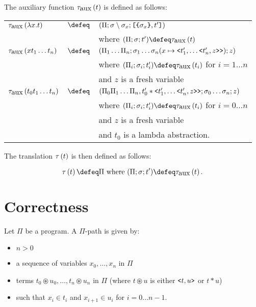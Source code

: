 \documentclass{article}
\begin{document}
The auxiliary function $\tau_{\mbox{aux}}\left(t\right)$ is defined as follows:

\begin{center}
\bgroup
\def\arraystretch{1.3}
\begin{tabular}{lcl}
    $\tau_{\mbox{aux}}\left(\lambda x. t\right) $ & $\defeq$ & $(\Pi; \sigma \setminus \sigma_x; \mbox{\texttt{[}}\mbox{\texttt{\{}}\sigma_x\mbox{\texttt{\}}}, t'\mbox{\texttt{]}}) $ \\
    & & where $(\cuts; \sigma; t') \defeq \ltransaux{t}$ \\
    $\tau_{\mbox{aux}}\left(x t_1 \ldots t_n\right)$ & $\defeq$ & $(\Pi_1\ldots\Pi_n; \sigma_1\ldots \sigma_n(x\mapsto\mbox{\texttt{<}} t_1', \ldots\mbox{\texttt{<}} t_n', z\mbox{\texttt{>}}\mbox{\texttt{>}}); z) $ \\
    & & where $(\cuts_i; \sigma_i; t_i') \defeq \ltransaux{t_i}$ for $i=1\ldots n$\\
    & & and $z$ is a fresh variable \\
    $\tau_{\mbox{aux}}\left(t_0 t_1 \ldots t_n\right)$ & $\defeq$ & $(\Pi_0\Pi_1\ldots\Pi_n, t_0' * \mbox{\texttt{<}} t_1', \ldots\mbox{\texttt{<}} t_n', z\mbox{\texttt{>}}\mbox{\texttt{>}}; \sigma_0\ldots \sigma_n; z)$ \\
    & & where $(\cuts_i; \sigma_i; t_i') \defeq \ltransaux{t_i}$ for $i=0\ldots n$ \\
    & & and $z$ is a fresh variable \\
    & & and $t_0$ is a lambda abstraction. \\
\end{tabular}
\egroup
\end{center}

The translation $\tau\left(t\right)$ is then defined as follows:

\[\ltrans{t} \defeq \cuts \mbox{ where } (\cuts; \sigma; t') \defeq \ltransaux{t}. \]

\section{Correctness}

\begin{definition}[$\Pi$-path]
    Let $\Pi$ be a program. A $\Pi$-path is given by:
    \begin{itemize}
        \item $n > 0$
        \item a sequence of variables $x_0, \ldots, x_n$ in $\Pi$
        \item terms $t_0 \circledast u_0, \ldots, t_n \circledast u_n$ in $\Pi$ (where $t \circledast u$ is either $\mbox{\texttt{<}} t, u\mbox{\texttt{>}}$ or $t * u$)
        \item such that $x_i \in t_i$ and $x_{i+1}\in u_i$ for $i=0\ldots n-1$.
    \end{itemize}
\end{definition}
\end{document}
